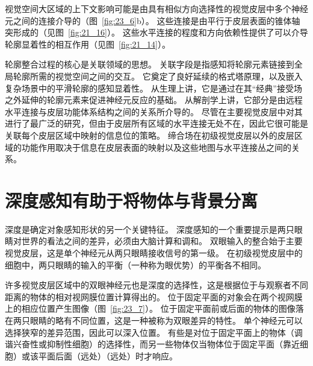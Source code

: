 视觉空间大区域的上下文影响可能是由具有相似方向选择性的视觉皮层中多个神经元之间的连接介导的（图~\ref{fig:23_6}b）。
这些连接是由平行于皮层表面的锥体轴突形成的（见图~\ref{fig:21_16}）。
这些水平连接的程度和方向依赖性提供了可以介导轮廓显着性的相互作用（见图~\ref{fig:21_14}）。


轮廓整合过程的核心是关联领域的思想。
关联字段是指感知将轮廓元素链接到全局轮廓所需的视觉空间之间的交互。
它奠定了良好延续的格式塔原理，以及嵌入复杂场景中的平滑轮廓的感知显着性。
从生理上讲，它是通过在其“经典”接受场之外延伸的轮廓元素来促进神经元反应的基础。
从解剖学上讲，它部分是由远程水平连接与皮层功能体系结构之间的关系所介导的。
尽管在主要视觉皮层中对其进行了最广泛的研究，但由于皮层所有区域的水平连接无处不在，因此它很可能是关联每个皮层区域中映射的信息位的策略。
缔合场在初级视觉皮层以外的皮层区域的功能作用取决于信息在皮层表面的映射以及这些地图与水平连接丛之间的关系。



\section{深度感知有助于将物体与背景分离}

深度是确定对象感知形状的另一个关键特征。
深度感知的一个重要提示是两只眼睛对世界的看法之间的差异，必须由大脑计算和调和。
双眼输入的整合始于主要视觉皮层，这是单个神经元从两只眼睛接收信号的第一级。
在初级视觉皮层中的细胞中，两只眼睛的输入的平衡（一种称为眼优势）的平衡各不相同。


许多视觉皮层区域中的双眼神经元也是深度的选择性，这是根据位于与观察者不同距离的物体的相对视网膜位置计算得出的。
位于固定平面的对象会在两个视网膜上的相应位置产生图像（图~\ref{fig:23_7}）。
位于固定平面前或后面的物体的图像落在两只眼睛的略有不同位置，这是一种被称为双眼差异的特性。
单个神经元可以选择狭窄的差异范围，因此可以深入位置。
有些是对位于固定平面上的物体（调谐兴奋性或抑制性细胞）的选择性，而另一些物体仅当物体位于固定平面（靠近细胞）或该平面后面（远处）（远处）时才响应。



